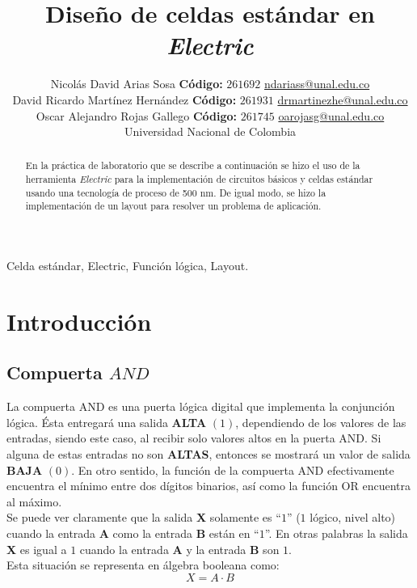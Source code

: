 \documentclass[twocolumn]{IEEEtran}
\begin{document}
\title{Diseño de celdas estándar en \textit{Electric}}
\author{Nicolás David Arias Sosa \textbf{Código:} $261692$ \url{ndariass@unal.edu.co}\\
	David Ricardo Martínez Hernández \textbf{Código:} $261931$ \url{drmartinezhe@unal.edu.co}\\
	Oscar Alejandro Rojas Gallego \textbf{Código:} $261745$ \url{oarojasg@unal.edu.co}\\
	Universidad Nacional de Colombia}
\markboth{}{}
\maketitle
\begin{abstract}
En la práctica de laboratorio que se describe a continuación se hizo el uso de la herramienta \textit{Electric} para la implementación de circuitos básicos y celdas estándar usando una tecnología de proceso de 500 nm. De igual modo, se hizo la implementación de un layout para resolver un problema de aplicación.
\end{abstract}
\begin{keywords}
Celda estándar, Electric, Función lógica, Layout.
\end{keywords}

\section{Introducción}
\subsection{Compuerta $AND$}
\noindent
La compuerta AND es una puerta lógica digital que implementa la conjunción lógica. Ésta entregará una salida \textbf{ALTA} $(1)$, dependiendo de los valores de las entradas, siendo este caso, al recibir solo valores altos en la puerta AND. Si alguna de estas entradas no son \textbf{ALTAS}, entonces se mostrará un valor de salida \textbf{BAJA} $(0)$. En otro sentido, la función de la compuerta AND efectivamente encuentra el mínimo entre dos dígitos binarios, así como la función OR encuentra al máximo.\\
Se puede ver claramente que la salida {\bf X} solamente es ``$1$'' ($1$ lógico, nivel alto) cuando la entrada {\bf A} como la entrada {\bf B} están en ``$1$''. En otras palabras la salida {\bf X} es igual a $1$ cuando la entrada {\bf A} y la entrada {\bf B} son $1$.\\
Esta situación se representa en álgebra booleana como:
\begin{equation}
 X  =  A \cdot B
 \label{ecu1}
\end{equation}
\end{document}
